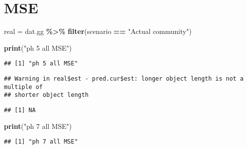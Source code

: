 \documentclass[
]{article}
\newenvironment{Shaded}{\begin{snugshade}}{\end{snugshade}}
\newcommand{\DecValTok}[1]{\textcolor[rgb]{0.00,0.00,0.81}{#1}}
\newcommand{\FunctionTok}[1]{\textcolor[rgb]{0.13,0.29,0.53}{\textbf{#1}}}
\newcommand{\NormalTok}[1]{#1}
\newcommand{\OtherTok}[1]{\textcolor[rgb]{0.56,0.35,0.01}{#1}}
\newcommand{\SpecialCharTok}[1]{\textcolor[rgb]{0.81,0.36,0.00}{\textbf{#1}}}
\newcommand{\StringTok}[1]{\textcolor[rgb]{0.31,0.60,0.02}{#1}}
\begin{document}
\hypertarget{mse}{%
\section{MSE}\label{mse}}

\begin{Shaded}
\begin{Highlighting}[]
\NormalTok{real }\OtherTok{=}\NormalTok{ dat.gg }\SpecialCharTok{\%\textgreater{}\%} 
  \FunctionTok{filter}\NormalTok{(scenario }\SpecialCharTok{==} \StringTok{"Actual community"}\NormalTok{)}

\FunctionTok{print}\NormalTok{(}\StringTok{"ph 5 all MSE"}\NormalTok{)}
\end{Highlighting}
\end{Shaded}

\begin{verbatim}
## [1] "ph 5 all MSE"
\end{verbatim}

\begin{Shaded}
\end{Shaded}

\begin{verbatim}
## Warning in real$est - pred.cur$est: longer object length is not a multiple of
## shorter object length
\end{verbatim}

\begin{verbatim}
## [1] NA
\end{verbatim}

\begin{Shaded}
\begin{Highlighting}[]
\FunctionTok{print}\NormalTok{(}\StringTok{"ph 7 all MSE"}\NormalTok{)}
\end{Highlighting}
\end{Shaded}

\begin{verbatim}
## [1] "ph 7 all MSE"
\end{verbatim}
\end{document}
